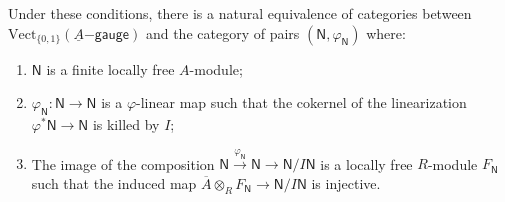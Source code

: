 \documentclass[10pt]{amsart}
\begin{document}
\begin{proposition}
\label{prop:adm_dieudonne_alb}
Under these conditions, there is a natural equivalence of categories between $\mathrm{Vect}_{\{0,1\}}(\underline{A}\mathsf{-gauge})$ and the category of pairs $(\mathsf{N},\varphi_{\mathsf{N}})$ where:
\begin{enumerate}
   \item $\mathsf{N}$ is a finite locally free $A$-module;
   \item $\varphi_{\mathsf{N}}:\mathsf{N}\to \mathsf{N}$ is a $\varphi$-linear map such that the cokernel of the linearization $\varphi^*\mathsf{N}\to \mathsf{N}$ is killed by $I$;
   \item The image of the composition $\mathsf{N}\xrightarrow{\varphi_{\mathsf{N}}}\mathsf{N}\to \mathsf{N}/I\mathsf{N}$ is a locally free $R$-module $F_{\mathsf{N}}$ such that the induced map $\overline{A}\otimes_{{R}}F_{\mathsf{N}}\to \mathsf{N}/I\mathsf{N}$ is injective.
\end{enumerate}
\end{proposition}
\end{document}
